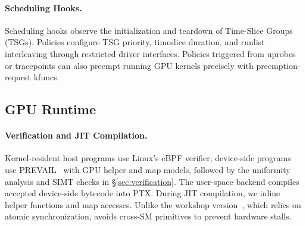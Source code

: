 \paragraph{Scheduling Hooks.}
Scheduling hooks observe the initialization and teardown of Time-Slice Groups (TSGs).
Policies configure TSG priority, timeslice duration, and runlist interleaving through restricted driver interfaces.
Policies triggered from uprobes or tracepoints can also preempt running GPU kernels precisely with preemption-request kfuncs.

\subsection{GPU Runtime}
\label{sec:impl-gpu}

\paragraph{Verification and JIT Compilation.}
Kernel-resident host programs use Linux's eBPF verifier; device-side programs use PREVAIL~\cite{prevail-verifier} with GPU helper and map models, followed by the uniformity analysis and SIMT checks in \S\ref{sec:verification}.
The user-space backend compiles accepted device-side bytecode into PTX.
During JIT compilation, we inline helper functions and map accesses.
Unlike the workshop version~\cite{egpu}, which relies on atomic synchronization, \sys{} avoids cross-SM primitives to prevent hardware stalls.

